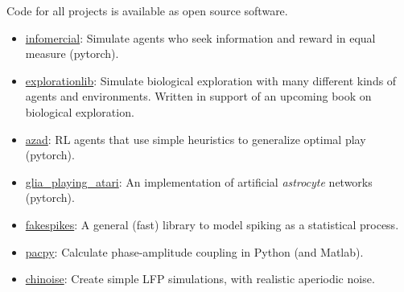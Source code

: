Code for all projects is available as open source software.

\begin{itemize}
\item
  \href{https://github.com/CoAxLab/infomercial}{infomercial}: Simulate
  agents who seek information and reward in equal measure (pytorch).
\item
  \href{https://github.com/parenthetical-e/explorationlib}{explorationlib}:
  Simulate biological exploration with many different kinds of agents
  and environments. Written in support of an upcoming book on biological
  exploration.
\item
  \href{https://github.com/CoAxLab/azad}{azad}: RL agents that use
  simple heuristics to generalize optimal play (pytorch).
\item
  \href{https://github.com/CoAxLab/glia_playing_atari}{glia\_playing\_atari}:
  An implementation of artificial \emph{astrocyte} networks (pytorch).
\item
  \href{https://github.com/voytekresearch/fakespikes}{fakespikes}: A
  general (fast) library to model spiking as a statistical process.
\item
  \href{https://github.com/voytekresearch/pacpy}{pacpy}: Calculate
  phase-amplitude coupling in Python (and Matlab).
\item
  \href{https://github.com/voytekresearch/chinoise}{chinoise}: Create
  simple LFP simulations, with realistic aperiodic noise.
\end{itemize}
